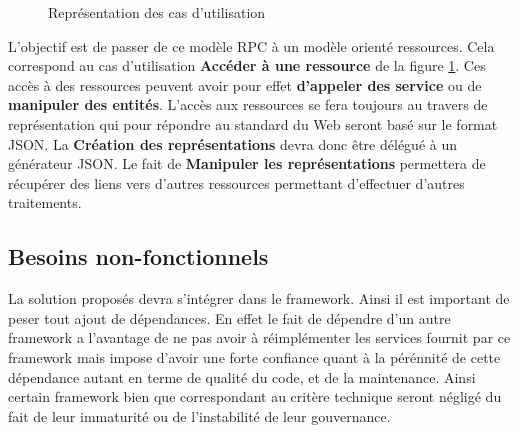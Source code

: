 \documentclass[a4paper, 11pt]{report}
\begin{document}
\begin{figure}
  \centering
  \caption{Représentation des cas d'utilisation}
  \label{fig:needs}
\end{figure}

L'objectif est de passer de ce modèle RPC à un modèle orienté
ressources. Cela correspond au cas d'utilisation \textbf{Accéder à une
  ressource} de la figure \ref{fig:needs}.  Ces accès à des ressources
peuvent avoir pour effet \textbf{d'appeler des service} ou de
\textbf{manipuler des entités}.  L'accès aux ressources se fera
toujours au travers de représentation qui pour répondre au standard du
Web seront basé sur le format JSON.  La \textbf{Création des
  représentations} devra donc être délégué à un générateur JSON. Le
fait de \textbf{Manipuler les représentations} permettera de récupérer
des liens vers d'autres ressources permettant d'effectuer d'autres
traitements.

\subsection{Besoins non-fonctionnels}

La solution proposés devra s'intégrer dans le framework. Ainsi il est
important de peser tout ajout de dépendances.  En effet le fait de
dépendre d'un autre framework a l'avantage de ne pas avoir à
réimplémenter les services fournit par ce framework mais impose
d'avoir une forte confiance quant à la pérénnité de cette dépendance
autant en terme de qualité du code, et de la maintenance.  Ainsi
certain framework bien que correspondant au critère technique seront
négligé du fait de leur immaturité ou de l'instabilité de leur
gouvernance.
\end{document}
